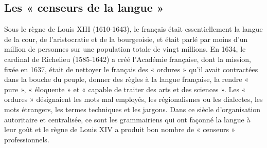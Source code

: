 \subsection{Les « censeurs de la langue »}
Sous le règne de Louis XIII (1610-1643), le français était essentiellement la langue de la cour, de l’aristocratie et de la bourgeoisie, et était parlé par moins d’un million de personnes sur une population totale de vingt millions. En 1634, le cardinal de Richelieu (1585-1642) a créé l’Académie française, dont la mission, fixée en 1637, était de nettoyer le français des « ordures » qu’il avait contractées dans la bouche du peuple, donner des règles à la langue française, la rendre « pure », « éloquente » et « capable de traiter des arts et des sciences ». Les « ordures » désignaient les mots mal employés, les régionalismes ou les dialectes, les mots étrangers, les termes techniques et les jargons. Dans ce siècle d’organisation autoritaire et centralisée, ce sont les grammairiens qui ont façonné la langue à leur goût et le règne de Louis XIV a produit bon nombre de « censeurs » professionnels.
